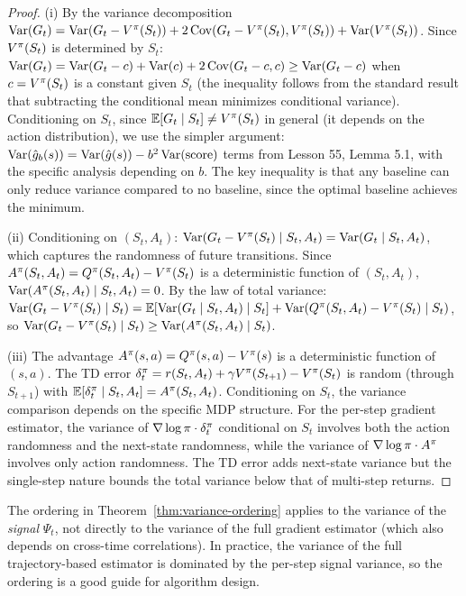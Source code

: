 \documentclass[11pt,a4paper]{article}
\begin{document}
\begin{proof}
(i) By the variance decomposition $\operatorname{Var}(G_t) = \operatorname{Var}(G_t - V^{\pi}(S_t))
+ 2\operatorname{Cov}(G_t - V^{\pi}(S_t), V^{\pi}(S_t)) + \operatorname{Var}(V^{\pi}(S_t))$. Since
$V^{\pi}(S_t)$ is determined by $S_t$:
$\operatorname{Var}(G_t) = \operatorname{Var}(G_t - c) + \operatorname{Var}(c) + 2\operatorname{Cov}(G_t - c, c) \geq
\operatorname{Var}(G_t - c)$ when $c = V^{\pi}(S_t)$ is a constant given $S_t$
(the inequality follows from the standard result that subtracting
the conditional mean minimizes conditional variance). Conditioning
on $S_t$, since $\mathbb{E}[G_t \mid S_t] \neq V^{\pi}(S_t)$ in general
(it depends on the action distribution), we use the simpler argument:
$\operatorname{Var}(\hat{g}_b(s)) = \operatorname{Var}(\hat{g}(s)) - b^2 \operatorname{Var}(\text{score})$
terms from Lesson 55, Lemma 5.1, with the specific analysis depending
on $b$. The key inequality is that any baseline can only reduce
variance compared to no baseline, since the optimal baseline
achieves the minimum.

(ii) Conditioning on $(S_t, A_t)$:
$\operatorname{Var}(G_t - V^{\pi}(S_t) \mid S_t, A_t) = \operatorname{Var}(G_t \mid S_t, A_t)$,
which captures the randomness of future transitions. Since
$A^\pi(S_t, A_t) = Q^{\pi}(S_t, A_t) - V^{\pi}(S_t)$ is a deterministic
function of $(S_t, A_t)$, $\operatorname{Var}(A^\pi(S_t, A_t) \mid S_t, A_t) = 0$.
By the law of total variance:
$\operatorname{Var}(G_t - V^{\pi}(S_t) \mid S_t) = \mathbb{E}[\operatorname{Var}(G_t \mid S_t, A_t) \mid S_t]
+ \operatorname{Var}(Q^{\pi}(S_t, A_t) - V^{\pi}(S_t) \mid S_t)$, so
$\operatorname{Var}(G_t - V^{\pi}(S_t) \mid S_t) \geq \operatorname{Var}(A^\pi(S_t, A_t) \mid S_t)$.

(iii) The advantage $A^\pi(s,a) = Q^{\pi}(s,a) - V^{\pi}(s)$ is a
deterministic function of $(s,a)$. The TD error $\delta_t^\pi =
r(S_t, A_t) + \gamma V^{\pi}(S_{t+1}) - V^{\pi}(S_t)$ is random (through
$S_{t+1}$) with $\mathbb{E}[\delta_t^\pi \mid S_t, A_t] = A^\pi(S_t, A_t)$.
Conditioning on $S_t$, the variance comparison depends on the specific
MDP structure. For the per-step gradient estimator, the variance of
$\nabla \log \pi \cdot \delta_t^\pi$ conditional on $S_t$ involves
both the action randomness and the next-state randomness, while the
variance of $\nabla \log \pi \cdot A^\pi$ involves only action
randomness. The TD error adds next-state variance but the single-step
nature bounds the total variance below that of multi-step returns.
\end{proof}

\begin{remark}
The ordering in Theorem~\ref{thm:variance-ordering} applies to the
variance of the \emph{signal} $\Psi_t$, not directly to the variance
of the full gradient estimator (which also depends on cross-time
correlations). In practice, the variance of the full trajectory-based
estimator is dominated by the per-step signal variance, so the ordering
is a good guide for algorithm design.
\end{remark}
\end{document}
